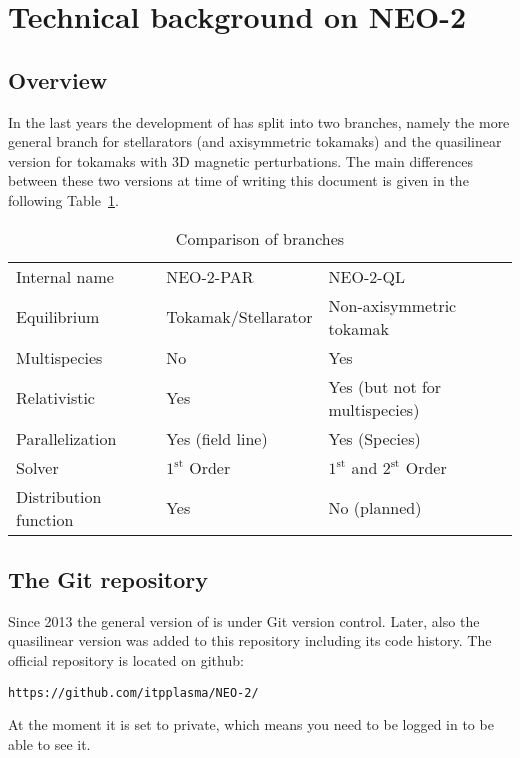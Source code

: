 \documentclass{article}
\newcommand{\vv}[1]{\texttt{\detokenize{#1}}}
\begin{document}
\section{Technical background on NEO-2}
\subsection{Overview}
In the last years the development of \vv{neo-2} has split into two branches,
namely the more general branch for stellarators (and axisymmetric
tokamaks) and the quasilinear version for tokamaks with 3D magnetic
perturbations. The main differences between these two versions at time
of writing this document is given in the following Table~\ref{tab:neo2branches}.

\begin{table}[h]
\centering
\begin{tabular}{lll}
Internal name   & NEO-2-PAR & NEO-2-QL\\
Equilibrium     & Tokamak/Stellarator & Non-axisymmetric tokamak\\
Multispecies    & No & Yes\\
Relativistic    & Yes & Yes (but not for multispecies)\\
Parallelization & Yes (field line) & Yes (Species)\\
Solver          & $1^\mathrm{st}$ Order & $1^\mathrm{st}$ and $2^\mathrm{st}$ Order\\
Distribution function & Yes & No (planned)
\end{tabular}
\caption{Comparison of \vv{neo-2} branches}
\label{tab:neo2branches}
\end{table}

\subsection{The Git repository}
Since 2013 the general version of \vv{neo-2} is under Git version control.
Later, also the quasilinear version was added to this repository
including its code history. The official repository is located on github:
\begin{verbatim}
https://github.com/itpplasma/NEO-2/
\end{verbatim}
At the moment it is set to private, which means you need to be logged in
to be able to see it.
\end{document}

